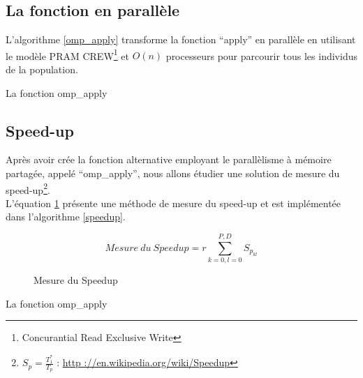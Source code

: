 \subsection{La fonction en parallèle}

L'algorithme \ref{omp_apply} transforme la fonction ``apply'' en parallèle en utilisant le modèle PRAM CREW\footnote{Concurantial Read Exclusive Write} et $O(n)$ processeurs pour parcourir tous les individus de la population.

\incmargin{1em}
\begin{algorithm}[here]
  \dontprintsemicolon
  \label{omp_apply}
  \caption{La fonction omp\_apply}
\end{algorithm}
\decmargin{1em}

\subsection{Speed-up}

Après avoir crée la fonction alternative employant le parallèlisme à mémoire partagée, appelé ``omp\_apply'', nous allons étudier une solution de mesure du speed-up\footnote{$S_p = \frac{T_1^*}{T_p}$ : \url{http ://en.wikipedia.org/wiki/Speedup}}.\\

L'équation \ref{fig:mesure_speedup} présente une méthode de mesure du speed-up et est implémentée dans l'algorithme \ref{speedup}.

\begin{figure}[here]
\centering
$$Mesure\ du\ Speedup = r \sum^{P,D}_{k=0,l=0} S_{p_{kl}}$$
\caption{Mesure du Speedup}
\label{fig:mesure_speedup}
\end{figure}

\incmargin{1em}
\begin{algorithm}[here]
  \dontprintsemicolon
  \label{speedup}
  \caption{La fonction omp\_apply}
\end{algorithm}
\decmargin{1em}

